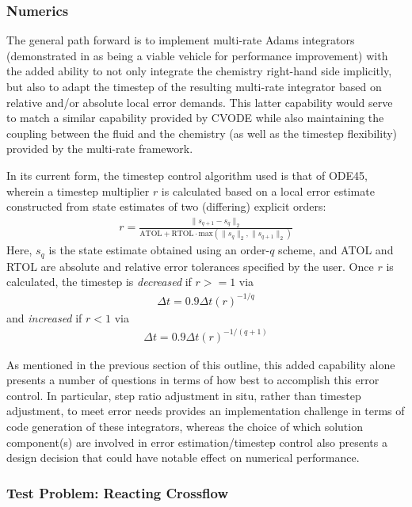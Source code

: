 \subsubsection{Numerics}

The general path forward is to implement multi-rate Adams integrators (demonstrated
in \cite{mikida2019multi} as being a viable vehicle for performance improvement) with
the added ability to not only integrate the chemistry right-hand side implicitly, but
also to adapt the timestep of the resulting multi-rate integrator based on relative and/or
absolute local error demands. This latter capability would serve to match a similar
capability provided by CVODE while also maintaining the coupling between the fluid and the
chemistry (as well as the timestep flexibility) provided by the multi-rate framework.

In its current form, the timestep control algorithm used is that of ODE45, wherein
a timestep multiplier $r$ is calculated based on a local error estimate constructed from
state estimates of two (differing) explicit orders:
\begin{align}
r = \frac{\|s_{q+1} - s_{q}\|_{2}}{\text{ATOL} + \text{RTOL} \cdot \text{max}(\|s_{q}\|_{2}, \|s_{q+1}\|_{2})}
\end{align}
Here, $s_{q}$ is the state estimate obtained using an order-$q$ scheme, and ATOL and RTOL are absolute and
relative error tolerances specified by the user. Once $r$ is calculated, the timestep is \emph{decreased} if
$r>=1$ via
\begin{align}
\Delta t = 0.9\Delta t (r)^{-1/q}
\end{align}
and \emph{increased} if $r<1$ via
\begin{align}
\Delta t = 0.9\Delta t (r)^{-1/(q+1)}
\end{align}

As mentioned in the previous section of this outline, this added capability alone
presents a number of questions in terms of how best to accomplish this error control.
In particular, step ratio adjustment in situ, rather than timestep adjustment, to meet
error needs provides an implementation challenge in terms of code generation of these
integrators, whereas the choice of which solution component(s) are involved in
error estimation/timestep control also presents a design decision that could have
notable effect on numerical performance.

\subsubsection{Test Problem: Reacting Crossflow}

